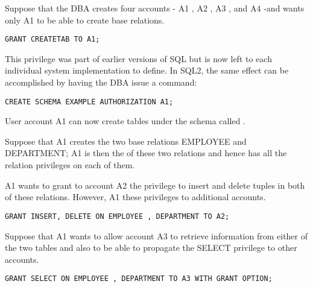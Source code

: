     \par {}
    \par Suppose that the DBA creates four accounts - A1 , A2 , A3 , and A4 -and wants only A1 to be able to create base relations.

\begin{verbatim}
GRANT CREATETAB TO A1;
\end{verbatim}

    \par This privilege was part of earlier versions of SQL but is now left to each individual system implementation to define. In SQL2, the same effect can be accomplished by having the DBA issue a  command:

\begin{verbatim}
CREATE SCHEMA EXAMPLE AUTHORIZATION A1;
\end{verbatim}

    \par User account A1 can now create tables under the schema called . 
    \par Suppose that A1 creates the two base relations EMPLOYEE and DEPARTMENT; A1 is then the  of these two relations and hence has all the relation privileges on each of them.

    \par {}
    \par A1 wants to grant to account A2 the privilege to insert and delete tuples in both of these relations. However, A1  these privileges to additional accounts.

\begin{verbatim}
GRANT INSERT, DELETE ON EMPLOYEE , DEPARTMENT TO A2;
\end{verbatim}
    
    \par Suppose that A1 wants to allow account A3 to retrieve information from either of the two tables and also to be able to propagate the SELECT privilege to other accounts.

\begin{verbatim}
GRANT SELECT ON EMPLOYEE , DEPARTMENT TO A3 WITH GRANT OPTION;
\end{verbatim}
    
